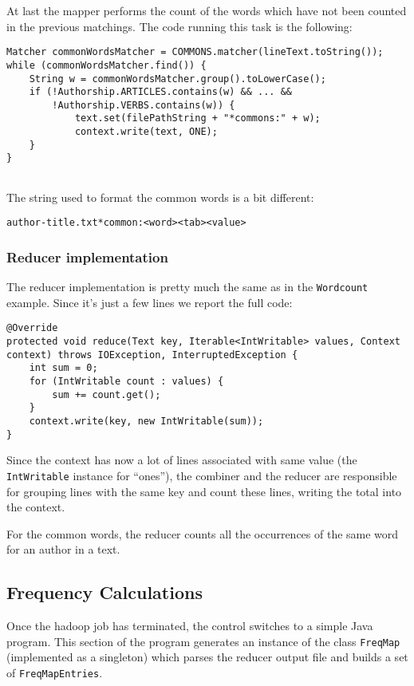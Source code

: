 \documentclass[a4paper,11pt, twoside]{article}
\begin{document}
	\noindent
	At last the mapper performs the count of the words which have not been counted in the previous matchings. The code running this task is the following:
	\begin{lstlisting}[firstnumber=119, caption={Common words counting in the Map method.}, captionpos=b]
Matcher commonWordsMatcher = COMMONS.matcher(lineText.toString());
while (commonWordsMatcher.find()) {
	String w = commonWordsMatcher.group().toLowerCase();
	if (!Authorship.ARTICLES.contains(w) && ... &&
		!Authorship.VERBS.contains(w)) {
			text.set(filePathString + "*commons:" + w);
			context.write(text, ONE);
	}
}
		
	\end{lstlisting}
	
	\noindent
	The string used to format the common words is a bit different: 
	\begin{center}
		\texttt{author-title.txt*common:<word><tab><value>}
	\end{center}
	
	\subsubsection{Reducer implementation}
		The reducer implementation is pretty much the same as in the \lstinline|Wordcount| example. Since it's just a few lines we report the full code:
	\begin{lstlisting}[firstnumber=152, caption={Reduce method}, captionpos=b]
@Override
protected void reduce(Text key, Iterable<IntWritable> values, Context context) throws IOException, InterruptedException {
	int sum = 0;
	for (IntWritable count : values) {
		sum += count.get();
	}
	context.write(key, new IntWritable(sum));
}
	\end{lstlisting}
	
		\noindent
		Since the context has now a lot of lines associated with same value (the \lstinline|IntWritable| instance for ``ones''), the combiner and the reducer are responsible for grouping lines with the same key and count these lines, writing the total into the context.
		
		\noindent
		For the common words, the reducer counts all the occurrences of the same word for an author in a text.
	
	\subsection{Frequency Calculations}
		Once the hadoop job has terminated, the control switches to a simple Java program. This section of the program generates an instance of the class \lstinline|FreqMap| (implemented as a singleton) which parses the reducer output file and builds a set of \lstinline|FreqMapEntries|.
		
\end{document}
